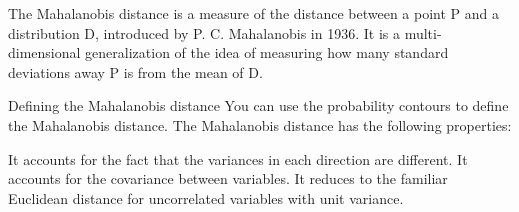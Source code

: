 The Mahalanobis distance is a measure of the distance between a point P and a distribution D, introduced by P. C. Mahalanobis in 1936. It is a multi-dimensional generalization of the idea of measuring 
how many standard deviations away P is from the mean of D.



Defining the Mahalanobis distance
You can use the probability contours to define the Mahalanobis distance. The Mahalanobis distance has the following properties:

It accounts for the fact that the variances in each direction are different.
It accounts for the covariance between variables.
It reduces to the familiar Euclidean distance for uncorrelated variables with unit variance.
